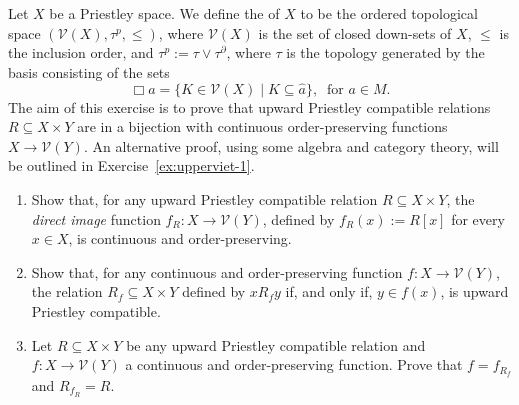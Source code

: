 \begin{exercise}\label{exe:compatible-to-vietoris}
  Let $X$ be a Priestley space. We define the  of $X$ to be the ordered topological space $(\mathcal{V}(X), \tau^p, \leq)$, where $\mathcal{V}(X)$ is the set of closed down-sets of $X$, $\leq$ is the inclusion order, and $\tau^p := \tau \vee \tau^\partial$, where $\tau$ is the topology generated by the basis consisting of the sets 
  \[\Box a=\{K\in\mathcal{V}(X)\mid K\subseteq \widehat{a}\},\ \text{ for } a\in M.\]
  The aim of this exercise is to prove that upward Priestley compatible relations $R \subseteq X \times Y$ are in a bijection with continuous order-preserving functions $X \to \mathcal{V}(Y)$. An alternative proof, using some algebra and category theory, will be outlined in Exercise~\ref{ex:upperviet-1}.

  \begin{enumerate}
    \item Show that, for any upward Priestley compatible relation $R \subseteq X \times Y$, the \emph{direct image} function $f_R \colon X \to \mathcal{V}(Y)$, defined by $f_R(x) := R[x]$ for every $x \in X$, is continuous and order-preserving.
    \item Show that, for any continuous and order-preserving function $f \colon X \to \mathcal{V}(Y)$, the relation $R_f \subseteq X \times Y$ defined by $x {R_f} y$ if, and only if, $y \in f(x)$, is upward Priestley compatible.
    \item Let $R \subseteq X \times Y$ be any upward Priestley compatible relation and $f \colon X \to \mathcal{V}(Y)$ a continuous and order-preserving function. Prove that $f = f_{R_f}$ and $R_{f_R} = R$.
  \end{enumerate}
\end{exercise}


